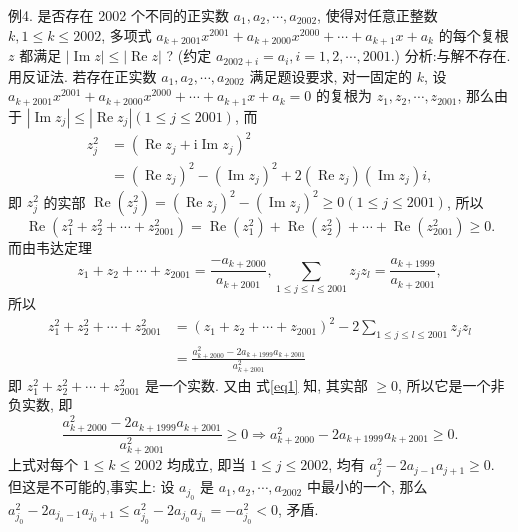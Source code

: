 例4. 是否存在 2002 个不同的正实数 $a_1, a_2, \cdots, a_{2002}$, 使得对任意正整数 $k, 1 \leqslant k \leqslant 2002$, 多项式 $a_{k+2001} x^{2001}+a_{k+2000} x^{2000}+\cdots+a_{k+1} x+a_k$ 的每个复根 $z$ 都满足 $|\operatorname{Im} z| \leqslant|\operatorname{Re} z|$ ? (约定 $a_{2002+i}=a_i, i=1,2, \cdots, 2001$.)
分析:与解不存在.
用反证法.
若存在正实数 $a_1, a_2, \cdots, a_{2002}$ 满足题设要求, 对一固定的 $k$, 设 $a_{k+2001} x^{2001}+a_{k+2000} x^{2000}+\cdots+a_{k+1} x+a_k=0$ 的复根为 $z_1, z_2, \cdots, z_{2001}$, 那么由于 $\left|\operatorname{Im} z_j\right| \leqslant\left|\operatorname{Re} z_j\right|(1 \leqslant j \leqslant 2001)$, 而
$$
\begin{aligned}
z_j^2 & =\left(\operatorname{Re} z_j+\mathrm{i} \operatorname{Im} z_j\right)^2 \\
& =\left(\operatorname{Re} z_j\right)^2-\left(\operatorname{Im} z_j\right)^2+2\left(\operatorname{Re} z_j\right)\left(\operatorname{Im} z_j\right) i,
\end{aligned}
$$
即 $z_j^2$ 的实部 $\operatorname{Re}\left(z_j^2\right)=\left(\operatorname{Re} z_j\right)^2-\left(\operatorname{Im} z_j\right)^2 \geqslant 0(1 \leqslant j \leqslant 2001)$, 所以
$$
\operatorname{Re}\left(z_1^2+z_2^2+\cdots+z_{2001}^2\right)=\operatorname{Re}\left(z_1^2\right)+\operatorname{Re}\left(z_2^2\right)+\cdots+\operatorname{Re}\left(z_{2001}^2\right) \geqslant 0 . \label{eq1}
$$
而由韦达定理
$$
z_1+z_2+\cdots+z_{2001}=\frac{-a_{k+2000}}{a_{k+2001}}, \sum_{1 \leqslant j \leqslant l \leqslant 2001} z_j z_l=\frac{a_{k+1999}}{a_{k+2001}},
$$
所以
$$
\begin{aligned}
z_1^2+z_2^2+\cdots+z_{2001}^2 & =\left(z_1+z_2+\cdots+z_{2001}\right)^2-2 \sum_{1 \leqslant j \leqslant l \leqslant 2001} z_j z_l \\
& =\frac{a_{k+2000}^2-2 a_{k+1999} a_{k+2001}}{a_{k+2001}^2}
\end{aligned}
$$
即 $z_1^2+z_2^2+\cdots+z_{2001}^2$ 是一个实数.
又由 式\ref{eq1} 知, 其实部 $\geqslant 0$, 所以它是一个非负实数, 即
$$
\frac{a_{k+2000}^2-2 a_{k+1999} a_{k+2001}}{a_{k+2001}^2} \geqslant 0 \Rightarrow a_{k+2000}^2-2 a_{k+1999} a_{k+2001} \geqslant 0 .
$$
上式对每个 $1 \leqslant k \leqslant 2002$ 均成立, 即当 $1 \leqslant j \leqslant 2002$, 均有 $a_j^2- 2 a_{j-1} a_{j+1} \geqslant 0$. 但这是不可能的,事实上:
设 $a_{j_0}$ 是 $a_1, a_2, \cdots, a_{2002}$ 中最小的一个, 那么 $a_{j_0}^2-2 a_{j_0-1} a_{j_0+1} \leqslant a_{j_0}^2- 2 a_{j_0} a_{j_0}=-a_{j_0}^2<0$, 矛盾.



